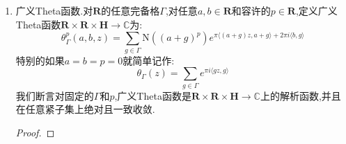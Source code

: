 \begin{enumerate}
\begin{proof}
\begin{itemize}
            \item $p=0$的等式右侧是:
            $$e^{-2\pi i\langle a,b\rangle-\pi\langle-b+y,-b+y\rangle+2\pi i\langle a,y\rangle}=e^{2\pi i\langle a,-b+y\rangle-\pi\langle-b+y,-b+y\rangle}$$
            这里:
            $$\langle a,-b+y\rangle=\sum_{\rho}a_{\rho}(-b_{\rho}+y_{\rho})+\sum_{\sigma}\left(a_{\sigma}(-b_{\overline{\sigma}}+y_{\overline{\sigma}})+a_{\overline{\sigma}}(-b_{\sigma}+y_{\sigma})\right)$$
            于是上述求导就得到:
            \begin{align*}
            	&\quad\mathrm{N}\left((2\pi i)^p\right)\mathrm{N}\left((-b+y)^p\right)e^{-2\pi i\langle a,b\rangle}f_0(-b,a,y)\\&=\mathrm{N}\left((2\pi i)^p\right)e^{-2\pi i\langle a,b\rangle}f_p(-b,a,y)
            \end{align*}
        \end{itemize}
    \end{proof}
    \item 广义Theta函数.对$\textbf{R}$的任意完备格$\Gamma$,对任意$a,b\in\textbf{R}$和容许的$p\in\textbf{R}$,定义广义Theta函数$\textbf{R}\times\textbf{R}\times\textbf{H}\to\mathbb{C}$为:
    $$\theta_{\Gamma}^p(a,b,z)=\sum_{g\in\Gamma}\mathrm{N}\left((a+g)^p\right)e^{\pi\langle(a+g)z,a+g\rangle+2\pi i\langle b,g\rangle}$$
    特别的如果$a=b=p=0$就简单记作:
    $$\theta_{\Gamma}(z)=\sum_{g\in\Gamma}e^{\pi i\langle gz,g\rangle}$$
    我们断言对固定的$\Gamma$和$p$,广义Theta函数是$\textbf{R}\times\textbf{R}\times\textbf{H}\to\mathbb{C}$上的解析函数,并且在任意紧子集上绝对且一致收敛.
    \begin{proof}
    	

\end{proof}
\end{enumerate}
